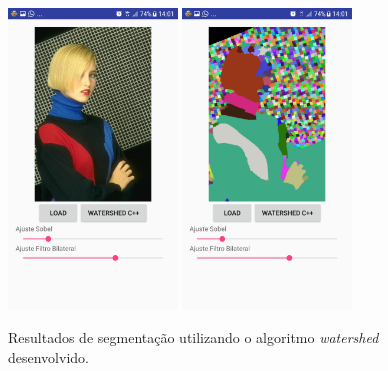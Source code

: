\begin{figure}[!htb]
 \centering
 \def\baselinestretch{1}\small\normalsize
 \includegraphics[width=0.4\textwidth]{img/imagem_watershed_desenvolvido_app_n4.png}\qquad
 \includegraphics[width=0.4\textwidth]{img/resultado_watershed_desenvolvido_app_n4.png} 
 \caption{\label{fig:resultado_watershed_desenvolvido_app_p4}Resultados de segmentação utilizando o algoritmo \textit{watershed} desenvolvido.}
\end{figure}
